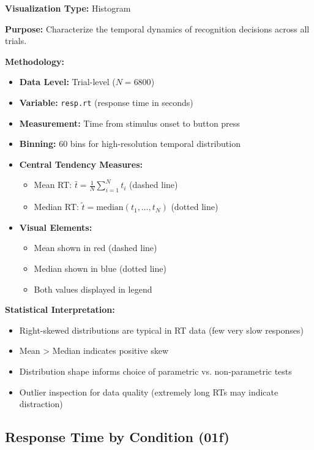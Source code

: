 \documentclass[12pt,a4paper]{article}
\begin{document}
\textbf{Visualization Type:} Histogram

\textbf{Purpose:} Characterize the temporal dynamics of recognition decisions across all trials.

\textbf{Methodology:}
\begin{itemize}
    \item \textbf{Data Level:} Trial-level ($N=6800$)
    \item \textbf{Variable:} \texttt{resp.rt} (response time in seconds)
    \item \textbf{Measurement:} Time from stimulus onset to button press
    \item \textbf{Binning:} 60 bins for high-resolution temporal distribution
    \item \textbf{Central Tendency Measures:}
        \begin{itemize}
            \item Mean RT: $\bar{t} = \frac{1}{N}\sum_{i=1}^{N} t_i$ (dashed line)
            \item Median RT: $\tilde{t} = \text{median}(t_1, \ldots, t_N)$ (dotted line)
        \end{itemize}
    \item \textbf{Visual Elements:}
        \begin{itemize}
            \item Mean shown in red (dashed line)
            \item Median shown in blue (dotted line)
            \item Both values displayed in legend
        \end{itemize}
\end{itemize}

\textbf{Statistical Interpretation:} 
\begin{itemize}
    \item Right-skewed distributions are typical in RT data (few very slow responses)
    \item Mean > Median indicates positive skew
    \item Distribution shape informs choice of parametric vs. non-parametric tests
    \item Outlier inspection for data quality (extremely long RTs may indicate distraction)
\end{itemize}

\subsection{Response Time by Condition (01f)}
\end{document}
